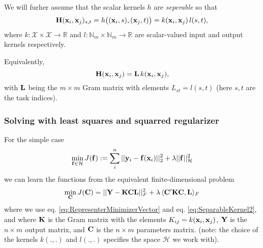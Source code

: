 We will furher assume that the scalar kernels $h$ are \emph{seperable} so that 
\begin{equation}\label{eq:SeparableKernel}
\mathbf{H}(\mathbf{x}_i,\mathbf{x}_j)_{s,t} =  h\big( (\mathbf{x}_i,s),(\mathbf{x}_j,t) \big) =
k(\mathbf{x}_i,\mathbf{x}_j) \, l(s,t),
\end{equation} 
where $k: \mathcal{X} \times \mathcal{X} \rightarrow \mathbb{R}$ and $l: \mathbb{N}_m
\times \mathbb{N}_m \rightarrow \mathbb{R}$ are scalar-valued input and output kernels
respectively.

Equivalently,
\begin{equation}\label{eq:SeparableKernel2}
 \mathbf{H}(\mathbf{x}_i,\mathbf{x}_j) = \mathbf{L} \, k(\mathbf{x}_i,\mathbf{x}_j),
\end{equation} 
with $\mathbf{L}$ being the $m \times m$ Gram matrix with elements $L_{st}=l(s,t)$ (here $s,t$
are the task indices).

\subsubsection{Solving with least squares and squarred regularizer}\label{sec:VectorSqESqR}

For the simple case 
\begin{equation}\label{eq:VectorSqESqR}
 \min_{\mathbf{f} \in \mathcal{H}} J(\mathbf{f}):= \sum_i^n || \mathbf{y}_i - \mathbf{f}(\mathbf{x}_i) ||_2^2 + \lambda
||\mathbf{f}||_\mathcal{H}^2
\end{equation} 
we can learn the functions from the equivalent finite-dimensional problem
\begin{equation}\label{eq:VectorKernelProblem}
 \min_{\mathbf{C}} J(\mathbf{C}) = || \mathbf{Y} - \mathbf{KCL} ||_F^2 + \lambda \, \langle \mathbf{C'KC}, \mathbf{L}
\rangle_F
\end{equation}
where we use eq. \eqref{eq:RepresenterMinimizerVector} and eq. \eqref{eq:SeparableKernel2},
and where $\mathbf{K}$ is the Gram matrix with the elements $K_{ij} = k(\mathbf{x}_i, \mathbf{x}_j)$,
$\mathbf{Y}$ is
the $n \times m$ output matrix, and $\mathbf{C}$ is the $n \times m$ parameters matrix.
(note: the choice of the kernels $k(.,.)$ and $l(.,.)$ specifies the space $\mathcal{H}$
we work with).

